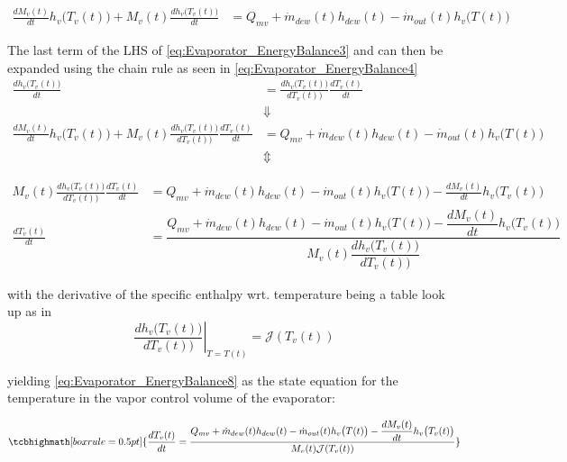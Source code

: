 \begin{align}
	\frac{ dM_{v}(t)}{dt} h_v\bigl(T_v(t)\bigr) + M_{v}(t) \frac{ dh_v \bigl(T_v(t)\bigr)}{dt}  & = Q_{mv} + \dot{m}_{dew}(t)h_{dew}(t) - \dot{m}_{out}(t)h_v\bigl(T(t)\bigr)		\label{eq:Evaporator_EnergyBalance3}
\end{align}

The last term of the LHS of \cref{eq:Evaporator_EnergyBalance3} and can then be expanded using the chain rule as seen in \cref{eq:Evaporator_EnergyBalance4}
\begin{align}
	\frac{ dh_v \bigl(T_v(t)\bigr)}{dt}  & = \frac{ dh_v \bigl(T_v(t)\bigr)}{dT_v(t))} \frac{dT_v(t)}{dt}	\label{eq:Evaporator_EnergyBalance4} \\
	& \Downarrow \\
	\frac{dM_{v}(t)}{dt} h_v\bigl(T_v(t)\bigr) + M_{v}(t) \frac{ dh_v \bigl(T_v(t)\bigr)}{dT_v(t))} \frac{dT_v(t)}{dt}  & = Q_{mv} + \dot{m}_{dew}(t)h_{dew}(t) - \dot{m}_{out}(t)h_v\bigl(T(t)\bigr)	\\
	& \Updownarrow
\end{align}

\begin{align}
	 M_{v}(t) \frac{ dh_v \bigl(T_v(t)\bigr)}{dT_v(t))} \frac{dT_v(t)}{dt}  & = Q_{mv} + \dot{m}_{dew}(t)h_{dew}(t) - \dot{m}_{out}(t)h_v\bigl(T(t)\bigr) - \frac{dM_{v}(t)}{dt} h_v\bigl(T_v(t)\bigr)  \label{eq:Evaporator_EnergyBalance5} \\
	 \frac{dT_v(t)}{dt}  & = \dfrac{Q_{mv} + \dot{m}_{dew}(t)h_{dew}(t) - \dot{m}_{out}(t)h_v\bigl(T(t)\bigr) - \dfrac{dM_{v}(t)}{dt} h_v\bigl(T_v(t)\bigr)}{M_{v}(t) \dfrac{ dh_v \bigl(T_v(t)\bigr)}{dT_v(t))} }  \label{eq:Evaporator_EnergyBalance6}
\end{align}

with the derivative of the specific enthalpy wrt. temperature being a table look up as in
\begin{equation}
	\left. \dfrac{ dh_v \bigl(T_v(t)\bigr)}{dT_v(t))} \right |_{T = T(t)}= \mathcal{J}(T_v(t)) \label{eq:Evaporator_EnergyBalance7}
\end{equation}

yielding \cref{eq:Evaporator_EnergyBalance8} as the state equation for the temperature in the vapor control volume of the evaporator:

\begin{equation}
	\tcbhighmath[boxrule = 0.5pt]{\frac{dT_v(t)}{dt}  = \dfrac{Q_{mv} + \dot{m}_{dew}(t)h_{dew}(t) - \dot{m}_{out}(t)h_v\bigl(T(t)\bigr) - \dfrac{dM_{v}(t)}{dt} h_v\bigl(T_v(t)\bigr)}{M_{v}(t) \mathcal{J}(T_v(t)) } } \label{eq:Evaporator_EnergyBalance8}
\end{equation}



